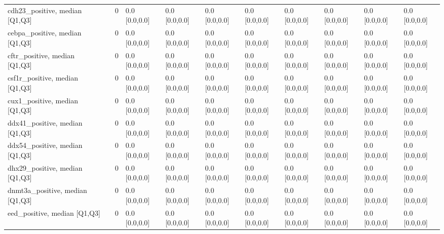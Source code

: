 \begin{tabular}{lllllllllll}
cdh23\_positive, median [Q1,Q3] &    &                    0 &       0.0 [0.0,0.0] &      0.0 [0.0,0.0] &        0.0 [0.0,0.0] &       0.0 [0.0,0.0] &     0.0 [0.0,0.0] &     0.0 [0.0,0.0] &       0.0 [0.0,0.0] &        0.0 [0.0,0.0] \\
cebpa\_positive, median [Q1,Q3] &    &                    0 &       0.0 [0.0,0.0] &      0.0 [0.0,0.0] &        0.0 [0.0,0.0] &       0.0 [0.0,0.0] &     0.0 [0.0,0.0] &     0.0 [0.0,0.0] &       0.0 [0.0,0.0] &        0.0 [0.0,0.0] \\
cftr\_positive, median [Q1,Q3] &    &                    0 &       0.0 [0.0,0.0] &      0.0 [0.0,0.0] &        0.0 [0.0,0.0] &       0.0 [0.0,0.0] &     0.0 [0.0,0.0] &     0.0 [0.0,0.0] &       0.0 [0.0,0.0] &        0.0 [0.0,0.0] \\
csf1r\_positive, median [Q1,Q3] &    &                    0 &       0.0 [0.0,0.0] &      0.0 [0.0,0.0] &        0.0 [0.0,0.0] &       0.0 [0.0,0.0] &     0.0 [0.0,0.0] &     0.0 [0.0,0.0] &       0.0 [0.0,0.0] &        0.0 [0.0,0.0] \\
cux1\_positive, median [Q1,Q3] &    &                    0 &       0.0 [0.0,0.0] &      0.0 [0.0,0.0] &        0.0 [0.0,0.0] &       0.0 [0.0,0.0] &     0.0 [0.0,0.0] &     0.0 [0.0,0.0] &       0.0 [0.0,0.0] &        0.0 [0.0,0.0] \\
ddx41\_positive, median [Q1,Q3] &    &                    0 &       0.0 [0.0,0.0] &      0.0 [0.0,0.0] &        0.0 [0.0,0.0] &       0.0 [0.0,0.0] &     0.0 [0.0,0.0] &     0.0 [0.0,0.0] &       0.0 [0.0,0.0] &        0.0 [0.0,0.0] \\
ddx54\_positive, median [Q1,Q3] &    &                    0 &       0.0 [0.0,0.0] &      0.0 [0.0,0.0] &        0.0 [0.0,0.0] &       0.0 [0.0,0.0] &     0.0 [0.0,0.0] &     0.0 [0.0,0.0] &       0.0 [0.0,0.0] &        0.0 [0.0,0.0] \\
dhx29\_positive, median [Q1,Q3] &    &                    0 &       0.0 [0.0,0.0] &      0.0 [0.0,0.0] &        0.0 [0.0,0.0] &       0.0 [0.0,0.0] &     0.0 [0.0,0.0] &     0.0 [0.0,0.0] &       0.0 [0.0,0.0] &        0.0 [0.0,0.0] \\
dnmt3a\_positive, median [Q1,Q3] &    &                    0 &       0.0 [0.0,0.0] &      0.0 [0.0,0.0] &        0.0 [0.0,0.0] &       0.0 [0.0,0.0] &     0.0 [0.0,0.0] &     0.0 [0.0,0.0] &       0.0 [0.0,0.0] &        0.0 [0.0,0.0] \\
eed\_positive, median [Q1,Q3] &    &                    0 &       0.0 [0.0,0.0] &      0.0 [0.0,0.0] &        0.0 [0.0,0.0] &       0.0 [0.0,0.0] &     0.0 [0.0,0.0] &     0.0 [0.0,0.0] &       0.0 [0.0,0.0] &        0.0 [0.0,0.0] \\

\end{tabular}
